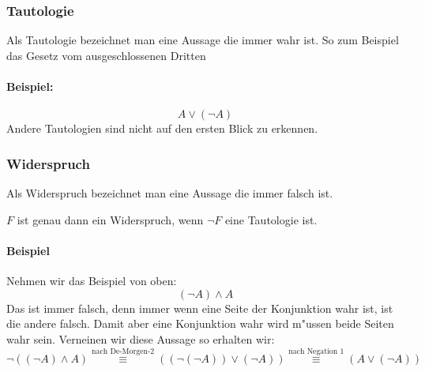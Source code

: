 \subsubsection{Tautologie}
Als Tautologie bezeichnet man eine Aussage die immer wahr ist. So zum Beispiel das Gesetz vom ausgeschlossenen Dritten

\paragraph*{Beispiel:}
\begin{equation*}
A \lor (\neg A)
\end{equation*}
Andere Tautologien sind nicht auf den ersten Blick zu erkennen.

\subsubsection{Widerspruch}
Als Widerspruch bezeichnet man eine Aussage die immer falsch ist. 
\begin{axiom}[Widerspruch]
$F$ ist genau dann ein Widerspruch, wenn $\neg F$ eine Tautologie ist.
\end{axiom}

\paragraph*{Beispiel}
Nehmen wir das Beispiel von oben:
\begin{equation*}
(\neg A) \land A
\end{equation*}
Das ist immer falsch, denn immer wenn eine Seite der Konjunktion wahr ist, ist die andere falsch. Damit aber eine Konjunktion wahr wird m"ussen beide Seiten wahr sein. Verneinen wir diese Aussage so erhalten wir:
\begin{equation*}
\neg ((\neg A) \land A) \stackrel{\text{nach De-Morgen-2}}{\equiv} ((\neg (\neg A)) \lor (\neg A)) \stackrel{\text{nach Negation 1}}{\equiv} (A \lor (\neg A))
\end{equation*} 

